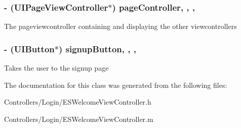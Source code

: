 \subsubsection[{page\+Controller}]{\setlength{\rightskip}{0pt plus 5cm}-\/ (U\+I\+Page\+View\+Controller$\ast$) page\+Controller\hspace{0.3cm}{\ttfamily [read]}, {\ttfamily [write]}, {\ttfamily [nonatomic]}, {\ttfamily [strong]}}\label{interface_e_s_welcome_view_controller_ae9b2c8b929156c91622ad2ebd384a05e}
The pageviewcontroller containing and displaying the other viewcontrollers \hypertarget{interface_e_s_welcome_view_controller_a4535c19b54f16ac2bb24553602cebc13}{}
\subsubsection[{signup\+Button}]{\setlength{\rightskip}{0pt plus 5cm}-\/ (U\+I\+Button$\ast$) signup\+Button\hspace{0.3cm}{\ttfamily [read]}, {\ttfamily [write]}, {\ttfamily [nonatomic]}, {\ttfamily [strong]}}\label{interface_e_s_welcome_view_controller_a4535c19b54f16ac2bb24553602cebc13}
Takes the user to the signup page 

The documentation for this class was generated from the following files\+:\begin{DoxyCompactItemize}
\item 
Controllers/\+Login/E\+S\+Welcome\+View\+Controller.\+h\item 
Controllers/\+Login/E\+S\+Welcome\+View\+Controller.\+m\end{DoxyCompactItemize}
